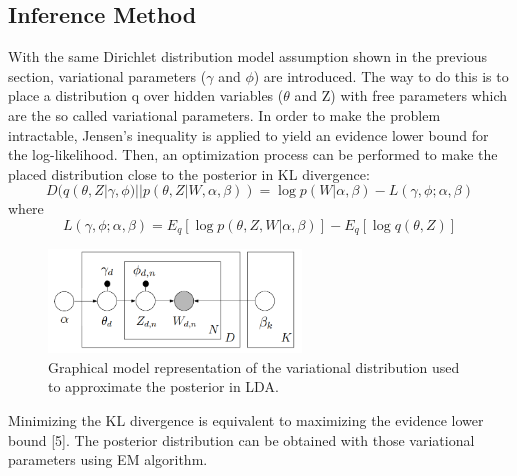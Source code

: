 \documentclass{article} %
\begin{document}
\subsection{Inference Method}
With the same Dirichlet distribution model assumption shown in the previous section, variational parameters ($\gamma$ and $\phi$) are introduced. The way to do this is to place a distribution q over hidden variables ($\theta$ and Z) with free parameters which are the so called variational parameters. In order to make the problem intractable, Jensen's inequality is applied to yield an evidence lower bound for the log-likelihood. Then, an optimization process can be performed to make the placed distribution close to the posterior in KL divergence:\\

\begin{equation}
D(q(\theta,Z|\gamma,\phi)||p(\theta,Z|W,\alpha,\beta)) = \log p(W|\alpha,\beta) - L(\gamma,\phi;\alpha,\beta)
\end{equation}
where
\begin{equation}
L(\gamma,\phi;\alpha,\beta) =E_q[\log p(\theta,Z,W|\alpha,\beta)] - E_q[\log q(\theta,Z)]
\end{equation}

\begin{figure}
    \centering
    \includegraphics[width=0.6\textwidth]{vi}
    \caption{Graphical model representation of the variational distribution used to approximate the posterior in LDA.}
    \label{fig:graphmodel}
\end{figure}

Minimizing the KL divergence is equivalent to maximizing the evidence lower bound [5]. The posterior distribution can be obtained with those variational parameters using EM algorithm.
\end{document}
